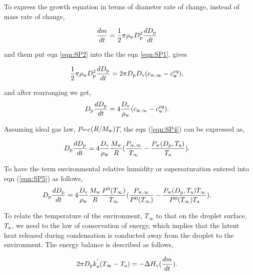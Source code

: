 \documentclass[12pt]{article}
\begin{document}
To express the growth equation in terms of diameter rate of change, instead of mass rate of change,

\begin{equation}\label{eqn:SP2}
\frac{dm}{dt}=\frac{1}{2} \pi \rho_{\rm w} D_{\rm p}^{2} \frac{dD_{\rm p}}{dt}
\end{equation}

and them put eqn \ref{eqn:SP2} into the the eqn \ref{eqn:SP1}, gives

\begin{equation}\label{eqn:SP3}
\frac{1}{2} \pi \rho_{\rm w} D_{\rm p}^{2} \frac{dD_{\rm p}}{dt}= 2 \pi D_{\rm p} D_{\rm v} (c_{\rm w, \infty} - c_{\rm w}^{\rm eq}),
\end{equation}

and after rearranging we get, 
\begin{equation}\label{eqn:SP4}
D_{\rm p}\frac{dD_{\rm p}}{dt}=4 \frac{D_{\rm v}} {\rho_{\rm w}} (c_{\rm w, \infty} - c_{\rm w}^{eq}).
\end{equation}

Assuming ideal gas law, $P$=$c$$(R / M_{\rm w})$$T$, the eqn (\ref{eqn:SP4}) can be expressed as,

\begin{equation}\label{eqn:SP5}
D_{\rm p}\frac{dD_{\rm p}}{dt}=4 \frac{D_{\rm v}} {\rho_{\rm w}} \frac{M_{\rm w}}{R} (\frac{P_{\rm w, \infty}}{T_{\infty}} - \frac{P_{\rm w}(D_{\rm p}, T_{\rm a})}{T_{\rm a}}).
\end{equation}

To have the term environmental relative humidity or supersaturation entered into eqn (\ref{eqn:SP5}) as follows,  
\begin{equation}\label{eqn:SP6}
D_{\rm p}\frac{dD_{\rm p}}{dt}=4  \frac{D_{\rm v}} {\rho_{\rm w}} \frac{M_{\rm w}}{R} \frac{P^{\rm 0}(T_{\infty})} {T_{\infty}} (\frac{P_{\rm w, \infty}}{P^{\rm 0}(T_{\infty})} - \frac{P_{\rm w}(D_{\rm p}, T_{\rm a}) T_{\infty}}{P^{\rm 0}(T_{\infty}) T_{\rm a}}).
\end{equation}

To relate the temperature of the environment, $T_{\infty}$ to that on the droplet surface, $T_{\rm a}$, we need to the law of conservation of energy, which implies that the latent heat released during condensation is conducted away from the droplet to the environment. The energy balance is described as follows, 

\begin{equation}\label{eqn:SP7}
2 \pi D_{\rm p} k^{'}_{\rm a} (T_{\infty}-T_{\rm a})= -\Delta H_{\rm v}(\frac{dm}{dt}).
\end{equation}
\end{document}
